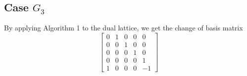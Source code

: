 \documentclass{article}
\theoremstyle{plain}
\theoremstyle{definition}
\newcommand{\tand}{\ensuremath{\,\,\, \text{and} \,\,\,}}
\begin{document}
\bigskip

\subsection{Case $G_3$}
By applying Algorithm 1 to the dual lattice, we get the change of basis matrix
$$
 \left[ \begin {array}{ccccc} 0&1&0&0&0\\ 0&0&1&0&0
\\ 0&0&0&1&0\\ 0&0&0&0&1
\\ 1&0&0&0&-1\end {array} \right] 
$$
\end{document}
